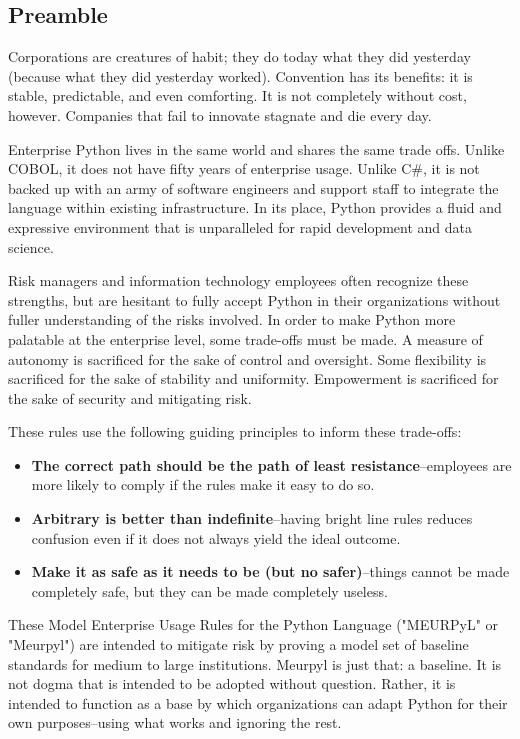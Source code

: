 

\subsection*{Preamble}
\thispagestyle{blank_style}

Corporations are creatures of habit; they do today what they did yesterday (because what they did yesterday worked). Convention has its benefits: it is stable, predictable, and even comforting. It is not completely without cost, however. Companies that fail to innovate stagnate and die every day.

Enterprise Python lives in the same world and shares the same trade offs. Unlike COBOL, it does not have fifty years of enterprise usage. Unlike C\#, it is not backed up with an army of software engineers and support staff to integrate the language within existing infrastructure. In its place, Python provides a fluid and expressive environment that is unparalleled for rapid development and data science.

Risk managers and information technology employees often recognize these strengths, but are hesitant to fully accept Python in their organizations without fuller understanding of the risks involved. In order to make Python more palatable at the enterprise level, some trade-offs must be made. A measure of autonomy is sacrificed for the sake of control and oversight. Some flexibility is sacrificed for the sake of stability and uniformity. Empowerment is sacrificed for the sake of security and mitigating risk. 

These rules use the following guiding principles to inform these trade-offs:

\begin{itemize}
	\item \textbf{The correct path should be the path of least resistance}--employees are more likely to comply if the rules make it easy to do so.
	\item \textbf{Arbitrary is better than indefinite}--having bright line rules reduces confusion even if it does not always yield the ideal outcome.
	\item \textbf{Make it as safe as it needs to be (but no safer)}--things cannot be made completely safe, but they can be made completely useless.
\end{itemize}

These Model Enterprise Usage Rules for the Python Language ("MEURPyL" or "Meurpyl") are intended to mitigate risk by proving a model set of baseline standards for medium to large institutions. Meurpyl is just that: a baseline. It is not dogma that is intended to be adopted without question. Rather, it is intended to function as a base by which organizations can adapt Python for their own purposes--using what works and ignoring the rest.
